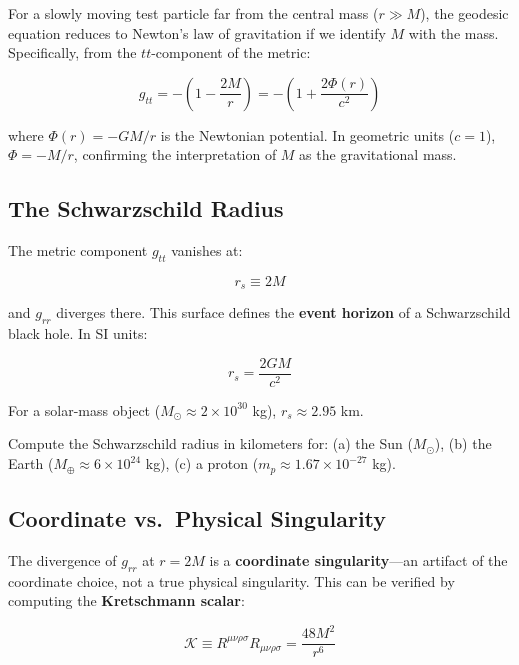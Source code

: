 \documentclass[12pt]{article}
\theoremstyle{definition}
\theoremstyle{remark}
\begin{document}
For a slowly moving test particle far from the central mass ($r \gg M$), the geodesic equation reduces to Newton's law of gravitation if we identify $M$ with the mass. Specifically, from the $tt$-component of the metric:

\begin{equation}
  g_{tt} = -\left(1 - \frac{2M}{r}\right) = -\left(1 + \frac{2\Phi(r)}{c^{2}}\right)
\end{equation}

where $\Phi(r) = -GM/r$ is the Newtonian potential. In geometric units ($c=1$), $\Phi = -M/r$, confirming the interpretation of $M$ as the gravitational mass.

\subsection{The Schwarzschild Radius}

The metric component $g_{tt}$ vanishes at:

\begin{equation}\label{eq:schwarzschild-radius}
  r_{s} \equiv 2M
\end{equation}

and $g_{rr}$ diverges there. This surface defines the \textbf{event horizon} of a Schwarzschild black hole. In SI units:

\begin{equation}
  r_{s} = \frac{2GM}{c^{2}}
\end{equation}

For a solar-mass object ($M_{\odot} \approx 2 \times 10^{30}$ kg), $r_{s} \approx 2.95$ km.

\begin{exbox}[label=ex:rs-calculation]
  Compute the Schwarzschild radius in kilometers for: (a) the Sun ($M_{\odot}$),
  (b) the Earth ($M_{\oplus} \approx 6\times 10^{24}$ kg),
  (c) a proton ($m_{p} \approx 1.67\times 10^{-27}$ kg).
\end{exbox}

\subsection{Coordinate vs.\ Physical Singularity}

The divergence of $g_{rr}$ at $r = 2M$ is a \textbf{coordinate singularity}---an artifact of the coordinate choice, not a true physical singularity. This can be verified by computing the \textbf{Kretschmann scalar}:

\begin{equation}
  \mathcal{K} \equiv R^{\mu\nu\rho\sigma}R_{\mu\nu\rho\sigma}
               = \frac{48M^{2}}{r^{6}}
\end{equation}
\end{document}
